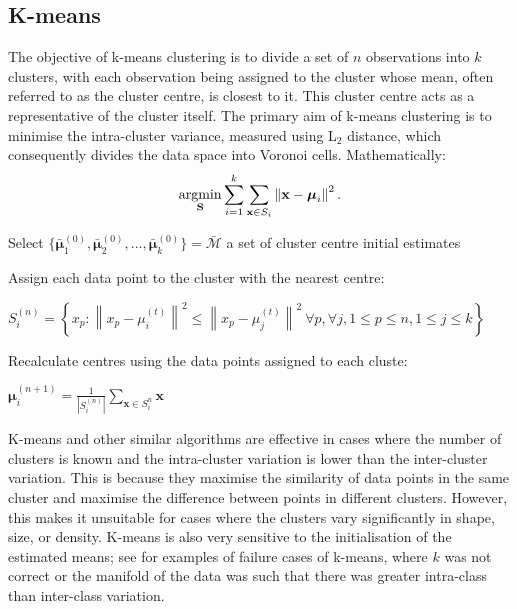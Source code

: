 \documentclass[../thesis.tex]{subfiles}
\begin{document}
\subsection{K-means}
The objective of k-means clustering is to divide a set of $n$ observations into $k$ clusters, with each observation being assigned to the cluster whose mean, often referred to as the cluster centre, is closest to it. This cluster centre acts as a representative of the cluster itself. The primary aim of k-means clustering is to minimise the intra-cluster variance, measured using L$_2$ distance, which consequently divides the data space into Voronoi cells. 
Mathematically:
\begin{equation}
    \operatorname*{argmin}_{\mathbf{S}}\sum _{i=1}^{k}\sum _{\mathbf {x} \in S_{i}}\left\|\mathbf {x} -{\boldsymbol {\mu }}_{i}\right\|^{2}.
\end{equation}
\begin{algorithm}
\caption{k-means algorithm}\label{alg__DMS__kmeans}
\begin{algorithmic}
\State Select $\{\boldsymbol{\bar{\mu}}^{(0)}_1, \boldsymbol{\bar{\mu}}^{(0)}_2, ..., \boldsymbol{\bar{\mu}}^{(0)}_k\} = \mathbf{\bar{\mathcal{M}}}$ a set of cluster centre initial estimates

    
    \State Assign each data point to the cluster with the nearest centre:
    
    \State $ S_{i}^{(n)}=\left\{x_{p}:\left\|x_{p}-\mu_{i}^{(t)}\right\|^{2}\leq \left\|x_{p}-\mu_{j}^{(t)}\right\|^{2}\ \forall p,  \forall j, 1\leq p\leq n, 1\leq j\leq k\right\}$
    
    \State Recalculate centres using the data points assigned to each cluste:
    
    \State $\boldsymbol{\mu}_i^{(n+1)} = {\frac {1}{\left|S_{i}^{(n)}\right|}}\sum _{\mathbf {x} \in S_{i}^{n}}\mathbf {x}$
\EndWhile
\EndFunction
\end{algorithmic}
\end{algorithm}
K-means and other similar algorithms are effective in cases where the number of clusters is known and the intra-cluster variation is lower than the inter-cluster variation. 
This is because they maximise the similarity of data points in the same cluster and maximise the difference between points in different clusters. However, this makes it unsuitable for cases where the clusters vary significantly in shape, size, or density. K-means is also very sensitive to the initialisation of the estimated means; see  for examples of failure cases of k-means, where $k$ was not correct or the manifold of the data was such that there was greater intra-class than inter-class variation.
\end{document}
